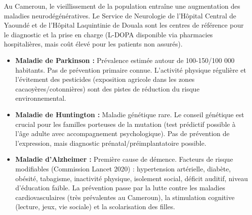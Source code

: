 \documentclass[11pt]{article}
\newcommand{\cle}[1]{{\popxbold\color{popdark}#1}}
\begin{document}
\begin{savaistu}
Au Cameroun, le vieillissement de la population entraîne une augmentation des maladies neurodégénératives. Le \cle{Service de Neurologie} de l'Hôpital Central de Yaoundé et de l'Hôpital Laquintinie de Douala sont les centres de référence pour le diagnostic et la prise en charge (L-DOPA disponible via pharmacies hospitalières, mais coût élevé pour les patients non assurés).
\begin{itemize}
\item \textbf{Maladie de Parkinson :} Prévalence estimée autour de 100-150/100 000 habitants. Pas de prévention primaire connue. L'activité physique régulière et l'évitement des pesticides (exposition agricole dans les zones cacaoyères/cotonnières) sont des pistes de réduction du risque environnemental.
\item \textbf{Maladie de Huntington :} Maladie génétique rare. Le \cle{conseil génétique} est crucial pour les familles porteuses de la mutation (test prédictif possible à l'âge adulte avec accompagnement psychologique). Pas de prévention de l'expression, mais diagnostic prénatal/préimplantatoire possible.
\item \textbf{Maladie d'Alzheimer :} Première cause de démence. Facteurs de risque modifiables (Commission Lancet 2020) : \cle{hypertension artérielle}, \cle{diabète}, \cle{obésité}, \cle{tabagisme}, \cle{inactivité physique}, \cle{isolement social}, \cle{déficit auditif}, \cle{niveau d'éducation faible}. La prévention passe par la lutte contre les maladies cardiovasculaires (très prévalentes au Cameroun), la stimulation cognitive (lecture, jeux, vie sociale) et la scolarisation des filles.
\end{itemize}
\end{savaistu}
\end{document}
